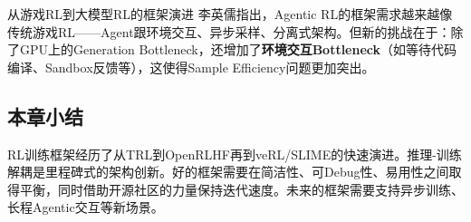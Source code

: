 \begin{knowledgebox}{从游戏RL到大模型RL的框架演进}
李英儒指出，Agentic RL的框架需求越来越像传统游戏RL——Agent跟环境交互、异步采样、分离式架构。但新的挑战在于：除了GPU上的Generation Bottleneck，还增加了\textbf{环境交互Bottleneck}（如等待代码编译、Sandbox反馈等），这使得Sample Efficiency问题更加突出。
\end{knowledgebox}

\subsection{本章小结}

RL训练框架经历了从TRL到OpenRLHF再到veRL/SLIME的快速演进。推理-训练解耦是里程碑式的架构创新。好的框架需要在简洁性、可Debug性、易用性之间取得平衡，同时借助开源社区的力量保持迭代速度。未来的框架需要支持异步训练、长程Agentic交互等新场景。


